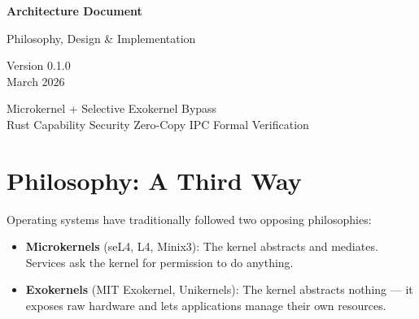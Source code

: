 \documentclass[11pt,a4paper]{article}
\begin{document}
\begin{titlepage}
\centering
\vspace*{3cm}


\vspace{2cm}

{\Huge\bfseries\sffamily Architecture Document}

\vspace{0.5cm}

{\Large\sffamily\color{accent!70} Philosophy, Design \& Implementation}

\vspace{2cm}

{\large\sffamily
Version 0.1.0\\[0.5em]
March 2026
}

\vfill

{\small\sffamily\color{gray}
Microkernel + Selective Exokernel Bypass\\
Rust \textbullet{} Capability Security \textbullet{} Zero-Copy IPC \textbullet{} Formal Verification
}
\end{titlepage}

\tableofcontents
\newpage

\section{Philosophy: A Third Way}

Operating systems have traditionally followed two opposing philosophies:

\begin{itemize}[leftmargin=2em]
  \item \textbf{Microkernels} (seL4, L4, Minix3): The kernel abstracts and mediates.
        Services ask the kernel for permission to do anything.
  \item \textbf{Exokernels} (MIT Exokernel, Unikernels): The kernel abstracts nothing ---
        it exposes raw hardware and lets applications manage their own resources.
\end{itemize}
\end{document}
